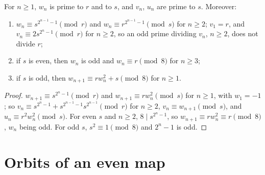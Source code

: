\begin{lemma}
  \label{lem:wseq-res}
  \leanok
  For $n \ge 1$, $w_n$ is prime to $r$ and to $s$, and $v_n$, $u_n$ are prime to $s$. Moreover:
  \begin{enumerate}
    \item $w_n \equiv s^{2^{n-1} - 1} \pmod r$ and $w_n \equiv r^{2^{n-1}-1} \pmod s$ for
          $n \ge 2$; $v_1 = r$, and $v_n \equiv 2 s^{2^n - 1} \pmod r$ for $n \ge 2$, so an odd
          prime dividing $v_n$, $n \ge 2$, does not divide $r$;
    \item if $s$ is even, then $w_n$ is odd and $w_n \equiv r \pmod 8$ for $n \ge 3$;
    \item if $s$ is odd, then $w_{n+1} \equiv r w_n^2 + s \pmod 8$ for $n \ge 1$.
  \end{enumerate}
\end{lemma}
\begin{proof}
  \leanok
  $w_{n+1} \equiv s^{2^n - 1} \pmod r$ and $w_{n+1} \equiv r w_n^2 \pmod s$ for $n \ge 1$, with
  $w_1 = -1$; so $v_n \equiv s^{2^n - 1} + s^{2^{n-1} - 1} s^{2^{n-1}} \pmod r$ for $n \ge 2$,
  $v_n \equiv w_{n+1} \pmod s$, and $u_n \equiv r^2 w_n^2 \pmod s$. For even $s$ and $n \ge 2$, $8 \mid s^{2^n - 1}$, so
  $w_{n+1} \equiv r w_n^2 \equiv r \pmod 8$, $w_n$ being odd. For odd $s$, $s^2 \equiv 1 \pmod 8$
  and $2^n - 1$ is odd.
\end{proof}

\section{Orbits of an even map}

